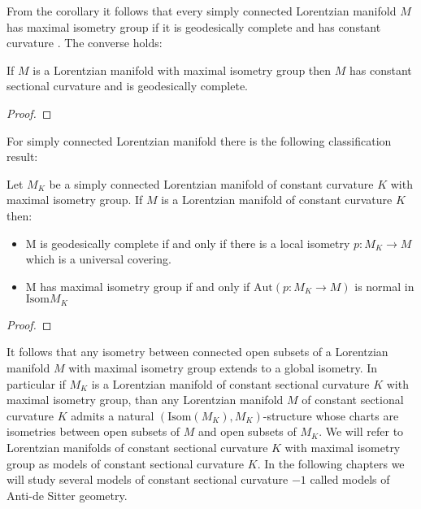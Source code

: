 From the corollary it follows that every simply connected Lorentzian manifold $M$ has maximal isometry group if it is geodesically complete and has constant curvature . The converse holds:
\begin{lemma}
    If $M$ is a Lorentzian manifold with maximal isometry group then $M$ has constant sectional curvature and is geodesically complete.
\end{lemma}
\begin{proof}
\end{proof}
For simply connected Lorentzian manifold there is the following classification result:
\begin{proposition}
    Let $M_K$ be a simply connected Lorentzian manifold of constant curvature $K$ with maximal isometry group. If $M$ is a Lorentzian manifold of constant curvature $K$ then:
    \begin{itemize}
        \item M is geodesically complete if and only if there is a local isometry $p:M_K \to M$ which is a universal covering.
        \item M has maximal isometry group if and only if $\text{Aut}(p:M_K \to M)$ is normal in $\text{Isom}M_K$
    \end{itemize}
\end{proposition} 
\begin{proof}
\end{proof}
It follows that any isometry between connected open subsets of a Lorentzian manifold $M$ with
maximal isometry group extends to a global isometry. In particular if $M_K$ is a Lorentzian
manifold of constant sectional curvature $K$ with maximal isometry group, than any Lorentzian
manifold $M$ of constant sectional curvature $K$ admits a natural $(\text{Isom}(M_K),M_K)$-structure
whose charts are isometries between open subsets of $M$ and open subsets of $M_K$.
We will refer to Lorentzian manifolds of constant sectional curvature $K$ with maximal isometry group as models of constant sectional curvature $K$. In the following chapters we will study several models of constant sectional curvature $-1$ called models of Anti-de Sitter geometry.